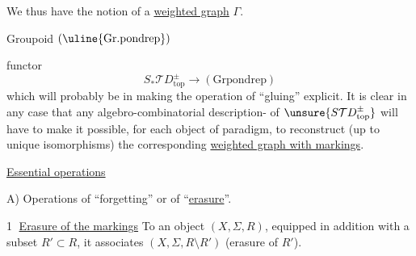 We thus have the notion of a \uline{weighted graph}   $\Gamma$.


Groupoid $(\uline{\mathrm{Gr.pondrep}})$

functor
\[
 S_*\mathcal TD_{\mathrm{top}}^\pm\longrightarrow(\mathrm{Grpondrep})
\]
which will probably be  in making the operation of ``gluing'' explicit.
It is clear in any case that any algebro-combinatorial description- of
$\unsure{S\mathcal TD_{\mathrm{top}}^\pm}$ will have to make it possible, for each object of
 paradigm, to reconstruct (up to unique isomorphisms) the corresponding \uline{weighted graph with markings}.

\uline{Essential operations}

A) Operations of ``forgetting'' or of ``\uline{erasure}''.

\textcircled{1} \uline{Erasure of the markings} To an object $(X,\Sigma,R)$, equipped in addition with a subset $R'\subset R$, it associates $(X,\Sigma,R\setminus R')$ (erasure of $R'$).
